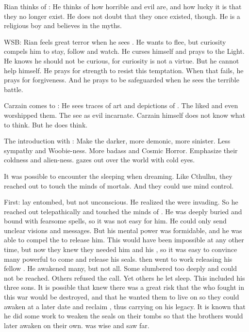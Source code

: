 Rian thinks of \dragons:
He thinks of how horrible and evil \dragons are, and how lucky it is that they no longer exist.
He does not doubt that they once existed, though.
He is a religious boy and believes in the myths.

WSB:
Rian feels great terror when he sees \Ishnaruchaefir.
He wants to flee, but curiosity compels him to stay, follow and watch.
He curses himself and prays to the Light.
He knows he should not be curious, for curiosity is not a virtue.
But he cannot help himself.
He prays for strength to resist this temptation.
When that fails, he prays for forgiveness.
And he prays to be safeguarded when he sees the terrible battle.

Carzain comes to \Forklin:
He sees traces of \Ortaican art and depictions of \dragons.
The \Ortaicans liked \dragons and even worshipped them.
The \Iquinians see \dragons as evil incarnate.
Carzain himself does not know what to think.
But he does think.

The introduction with \Nzessuacrith:
Make the \dragons darker, more demonic, more sinister.
Less sympathy and Woobie-ness. More badass and Cosmic Horror.
Emphasize their coldness and alien-ness.
\Nzessuacrith gazes out over the world with cold \ophidian eyes.

It was possible to encounter the sleeping \dragons when dreaming.
Like Cthulhu, they reached out to touch the minds of mortals.
And they could use mind control.

First\banewar: 
\Sethicus lay entombed, but not unconscious.
He realized the \banes were invading.
So he reached out telepathically and touched the minds of \ophidians.
He was deeply buried and bound with fearsome spells, so it was not easy for him.
He could only send unclear visions and messages.
But his mental power was formidable, and he was able to compel the \ophidians to release him.
This would have been impossible at any other time, but now they knew they needed him and his \dragons, so it was easy to convince many powerful \ophidians to come and release his seals.
\Sethicus then went to work releasing his fellow \dragons.
He awakened many, but not all.
Some slumbered too deeply and could not be reached.
Others refused the call.
Yet others he let sleep.
This included his three sons.
It is possible that \Sethicus knew there was a great risk that the \dragons who fought in this war would be destroyed, and that he wanted them to live on so they could awaken at a later date and reclaim \Miith, thus carrying on his legacy.
It is known that he did some work to weaken the seals on their tombs so that the brothers would later awaken on their own.
\Sethicus was wise and saw far.

